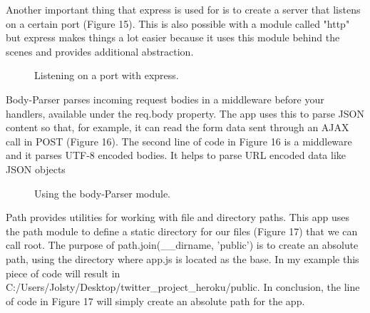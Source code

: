 \documentclass[12pt]{article} %
\begin{document}
	\noindent Another important thing that express is used for is to create a server that listens on a certain port (Figure 15).
	This is also possible with a module called "http" but express makes things a lot easier because it uses this module behind the scenes and provides additional abstraction.

	\begin{figure}[H] %
	\caption{Listening on a port with express.}
	\label{expresslisten}
	\end{figure}
 
	\noindent Body-Parser \cite{body-parser} parses incoming request bodies in a middleware before your handlers, available under the req.body property.
	The app uses this to parse JSON content so that, for example, it can read the form data sent through an AJAX call in POST (Figure 16).
	The second line of code in Figure 16  is a middleware and it parses UTF-8 encoded bodies. It helps to parse URL encoded data like JSON objects

	\begin{figure}[H] %
	\caption{Using the body-Parser module.}
	\label{bodyparser}
	\end{figure}

	\noindent Path \cite{path} provides utilities for working with file and directory paths. This app uses the path module to define a static directory for our files (Figure 17) that we can call root.
	The purpose of path.join(\_\_dirname, 'public') is to create an absolute path, using the directory where app.js is located as the base. In my example this piece of code will result in 
	C:/Users/Jolsty/Desktop/twitter\_project\_heroku/public. In conclusion, the line of code in Figure 17 will simply create an absolute path for the app.
\end{document}
